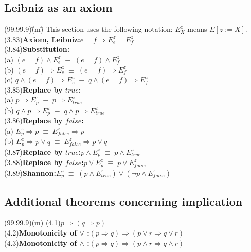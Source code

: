 \documentclass{amsart}
\newcommand{\lgap}{2pt}                             %
\newcommand{\equivs}{\ensuremath{\;\equiv\;}}       %
\newcommand{\impl}{\ensuremath{\Rightarrow}}        %
\begin{document}
\subsection*{Leibniz as an axiom}
\begin{tabbing}
(99.99.9)\;\=(m)\;\=\kill
This section uses the following notation: $E^{z}_{X}$ means $E[z := X]$.\\[\lgap]
(3.83)\>\textbf{Axiom, Leibniz:}\quad $e=f\impl E^{z}_{e} = E^{z}_{f}$\\[\lgap]
(3.84)\>\textbf{Substitution:}\\
      \> (a)\> $(e=f) \land E^{z}_{e} \equivs (e=f)\land E^{z}_{f}$\\[\lgap]
      \> (b)\> $(e=f) \impl E^{z}_{e} \equivs (e=f)\impl E^{z}_{f}$\\[\lgap]
      \> (c)\> $q\land (e=f) \impl E^{z}_{e} \equivs q\land (e=f)\impl E^{z}_{f}$\\[\lgap]
(3.85)\>\textbf{Replace by $true$:}\\
      \> (a)\> $p \impl E^{z}_{p} \equivs p\impl E^{z}_{true}$\\[\lgap]
      \> (b)\> $q\land p \impl E^{z}_{p} \equivs q\land p\impl E^{z}_{true}$\\[\lgap]
(3.86)\>\textbf{Replace by $false$:}\\
      \> (a)\> $E^{z}_{p} \impl p \equivs E^{z}_{false}\impl p$\\[\lgap]
      \> (b)\> $E^{z}_{p} \impl p\lor q \equivs E^{z}_{false}\impl p\lor q$\\[\lgap]
(3.87)\>\textbf{Replace by $true$:}\quad $p\land E^{z}_{p} \equivs p\land E^{z}_{true}$\\[\lgap]
(3.88)\>\textbf{Replace by $false$:}\quad $p\lor E^{z}_{p} \equivs p\lor E^{z}_{false}$\\[\lgap]
(3.89)\>\textbf{Shannon:}\quad $E^{z}_{p}\equivs (p\land E^{z}_{true}) \lor (\neg p\land E^{z}_{false})$\\
\end{tabbing}

\subsection*{Additional theorems concerning implication}
\begin{tabbing}
(99.99.9)\;\=(m)\;\=\kill
(4.1)\>$p\impl (q\impl p)$\\[\lgap]
(4.2)\>\textbf{Monotonicity of $\lor$ :}\quad $(p\impl q) \impl (p\lor r \impl q\lor r)$\\[\lgap]
(4.3)\>\textbf{Monotonicity of $\land$ :}\quad $(p\impl q) \impl (p\land r \impl q\land r)$\\[\lgap]
\end{tabbing}
\end{document}
